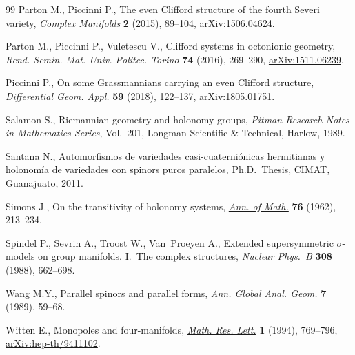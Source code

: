 \documentclass[pdftex]{sigma}
\numberwithin{equation}{section}
\begin{document}
\begin{thebibliography}{99}
Parton M., Piccinni P., The even {C}lifford structure of the fourth {S}everi
 variety, \href{https://doi.org/10.1515/coma-2015-0008}{\textit{Complex Manifolds}} \textbf{2} (2015), 89--104,
 \href{https://arxiv.org/abs/1506.04624}{arXiv:1506.04624}.

Parton M., Piccinni P., Vuletescu V., Clifford systems in octonionic geometry,
 \textit{Rend. Semin. Mat. Univ. Politec. Torino} \textbf{74} (2016),
 269--290, \href{https://arxiv.org/abs/1511.06239}{arXiv:1511.06239}.

Piccinni P., On some {G}rassmannians carrying an even {C}lifford structure,
 \href{https://doi.org/10.1016/j.difgeo.2018.04.007}{\textit{Differential Geom. Appl.}} \textbf{59} (2018), 122--137,
 \href{https://arxiv.org/abs/1805.01751}{arXiv:1805.01751}.

Salamon S., Riemannian geometry and holonomy groups, \textit{Pitman Research
 Notes in Mathematics Series}, Vol.~201, Longman Scientific \& Technical,
 Harlow, 1989.

Santana N., Automorfismos de variedades casi-cuaterni\'onicas hermitianas y holonom\'ia de variedades con spinors puros paralelos, Ph.D.~Thesis, CIMAT, Guanajuato, 2011.

Simons J., On the transitivity of holonomy systems, \href{https://doi.org/10.2307/1970273}{\textit{Ann. of Math.}}
 \textbf{76} (1962), 213--234.

Spindel P., Sevrin A., Troost W., Van~Proeyen A., Extended supersymmetric
 {$\sigma$}-models on group manifolds. {I}.~{T}he complex structures,
 \href{https://doi.org/10.1016/0550-3213(88)90582-2}{\textit{Nuclear Phys.~B}} \textbf{308} (1988), 662--698.

Wang M.Y., Parallel spinors and parallel forms, \href{https://doi.org/10.1007/BF00137402}{\textit{Ann. Global Anal.
 Geom.}} \textbf{7} (1989), 59--68.

Witten E., Monopoles and four-manifolds, \href{https://doi.org/10.4310/MRL.1994.v1.n6.a13}{\textit{Math. Res. Lett.}} \textbf{1}
 (1994), 769--796, \href{https://arxiv.org/abs/hep-th/9411102}{arXiv:hep-th/9411102}.

\end{thebibliography}\LastPageEnding
\end{document}
